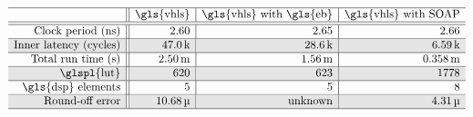 \begin{table}[ht]
    \centering
    \renewcommand\arraycolsep{1.0mm}
    \newcommand\unitk{\,\text{k}}
    \newcommand\unitm{\,\text{m}}
    \newcommand\unitmu{\,\text{\textmu}}
    \newcommand\unitM{\,\text{M}}
    \newcommand\unitG{\,\text{G}}
    \newcommand\Mid[1]{\multirow{2}*{$#1$}}
    \newcommand\Shade{\cellcolor{black!10}}
    \newcommand\name[1]{\texttt{\scriptsize #1}}
    \caption{%
        Comparison among the optimized implementations generated by
        \gls{vhls}'s expression balancing and our optimizer.  The row ``Total
        run time (s)'' indicates the wall-clock time in seconds of running the
        synthesized circuits.
    }\label{lo:tab:seidel_results}
    $\begin{array}{r||r|r|r}
        \hline
        \multicolumn{1}{c||}{} &
        \multicolumn{1}{c|}{\text{\gls{vhls}}} &
        \multicolumn{1}{c|}{\text{\gls{vhls} with \gls{eb}}} &
        \multicolumn{1}{c}{\text{\gls{vhls} with \soap}} \\

        \hline\hline

        \text{Clock period (ns)} &
        2.60 & 2.65 & 2.66 \\ \hline

        \Shade \text{Inner latency (cycles)} &
        \Shade 47.0\unitk & \Shade 28.6\unitk & \Shade 6.59\unitk \\ \hline

        \text{Total run time (s)} &
        2.50\unitm & 1.56\unitm & 0.358\unitm \\ \hline

        \Shade \text{\glspl{lut}} &
        \Shade 620 & \Shade 623 & \Shade 1778 \\ \hline

        \text{\gls{dsp} elements} &
        5 & 5 & 8 \\ \hline

        \Shade \text{Round-off error} &
        \Shade 10.68\unitmu &
        \Shade \text{unknown} &
        \Shade 4.31\unitmu \\ \hline
    \end{array}$
\end{table}
